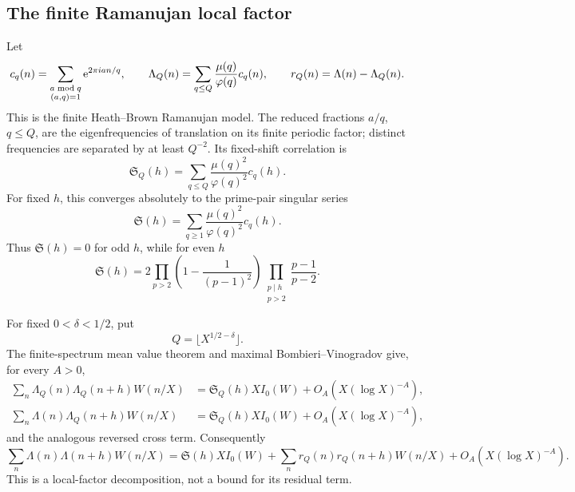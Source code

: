 \subsection{The finite Ramanujan local factor}

Let
\begin{equation}
 c_q(n)=\sum_{\substack{a\bmod q\\(a,q)=1}}
 \mathrm e^{2\pi ian/q},
 \qquad
 \Lambda_Q(n)=\sum_{q\leq Q}\frac{\mu(q)}{\varphi(q)}c_q(n),
 \qquad
 r_Q(n)=\Lambda(n)-\Lambda_Q(n).
 \label{eq:intro-HB-model}
\end{equation}
This is the finite Heath--Brown Ramanujan model.  The reduced fractions
$a/q$, $q\leq Q$, are the eigenfrequencies of translation on its finite
periodic factor; distinct frequencies are separated by at least $Q^{-2}$.
Its fixed-shift correlation is
\begin{equation}
 \mathfrak S_Q(h)=
 \sum_{q\leq Q}\frac{\mu(q)^2}{\varphi(q)^2}c_q(h).
 \label{eq:intro-truncated-singular-series}
\end{equation}
For fixed $h$, this converges absolutely to the prime-pair singular series
\begin{equation}
 \mathfrak S(h)=
 \sum_{q\geq1}\frac{\mu(q)^2}{\varphi(q)^2}c_q(h).
 \label{eq:intro-singular-series}
\end{equation}
Thus $\mathfrak S(h)=0$ for odd $h$, while for even $h$
\begin{equation}
 \mathfrak S(h)=
 2\prod_{p>2}\left(1-\frac1{(p-1)^2}\right)
 \prod_{\substack{p\mid h\\p>2}}\frac{p-1}{p-2}.
 \label{eq:intro-singular-product}
\end{equation}

For fixed $0<\delta<1/2$, put
\begin{equation}
 Q=\lfloor X^{1/2-\delta}\rfloor.
 \label{eq:intro-Q-range}
\end{equation}
The finite-spectrum mean value theorem and maximal
Bombieri--Vinogradov give, for every $A>0$,
\begin{align}
 \sum_n\Lambda_Q(n)\Lambda_Q(n+h)W(n/X)
 &=\mathfrak S_Q(h)XI_0(W)+O_A(X(\log X)^{-A}),
 \label{eq:intro-model-model}\\
 \sum_n\Lambda(n)\Lambda_Q(n+h)W(n/X)
 &=\mathfrak S_Q(h)XI_0(W)+O_A(X(\log X)^{-A}),
 \label{eq:intro-prime-model}
\end{align}
and the analogous reversed cross term.  Consequently
\begin{equation}
 \sum_n\Lambda(n)\Lambda(n+h)W(n/X)
 =\mathfrak S(h)XI_0(W)
 +\sum_nr_Q(n)r_Q(n+h)W(n/X)
 +O_A(X(\log X)^{-A}).
 \label{eq:intro-residual-correlation}
\end{equation}
This is a local-factor decomposition, not a bound for its residual term.

